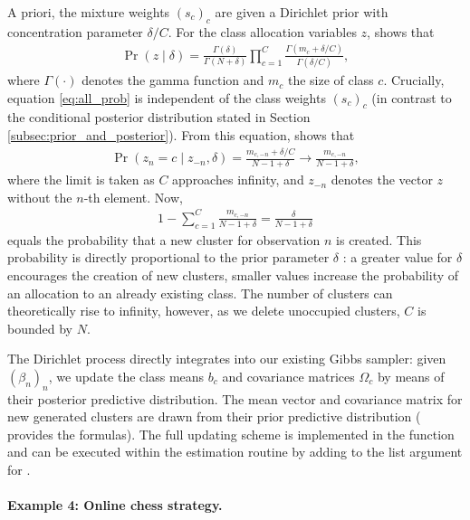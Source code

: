 \documentclass[article,shortnames]{jss}
\newcommand{\fct}[1]{\code{#1()}}
\begin{document}
A priori, the mixture weights $(s_c)_c$ are given a Dirichlet prior with concentration parameter $\delta/C$. For the class allocation variables $z$, \cite{Rasmussen:2000} shows that
\begin{align}
  \label{eq:all_prob}
  \Pr(z \mid \delta) = \frac{\Gamma(\delta)}{\Gamma(N+\delta)} \prod_{c=1}^C \frac{\Gamma(m_c + \delta/C)}{\Gamma(\delta/C)},
\end{align}
where $\Gamma(\cdot)$ denotes the gamma function and $m_c$ the size of class $c$. Crucially, equation \eqref{eq:all_prob} is independent of the class weights $(s_c)_c$ (in contrast to the conditional posterior distribution stated in Section \ref{subsec:prior_and_posterior}). From this equation, \cite{Li:2019} shows that
\begin{align*}
  \Pr(z_n = c \mid z_{-n}, \delta) = \frac{m_{c,-n} + \delta/C}{N-1+\delta} \to \frac{m_{c,-n}}{N-1+\delta},
\end{align*}
where the limit is taken as $C$ approaches infinity, and $z_{-n}$ denotes the vector $z$ without the $n$-th element. Now,
\begin{align*}
  1 - \sum_{c = 1}^C \frac{m_{c,-n}}{N-1+\delta} = \frac{\delta}{N-1+\delta}
\end{align*}
equals the probability that a new cluster for observation $n$ is created. This probability is directly proportional to the prior parameter $\delta$ \citep{Neal:2000}: a greater value for $\delta$ encourages the creation of new clusters, smaller values increase the probability of an allocation to an already existing class. The number of clusters can theoretically rise to infinity, however, as we delete unoccupied clusters, $C$ is bounded by $N$.

The Dirichlet process directly integrates into our existing Gibbs sampler: given $(\beta_n)_n$, we update the class means $b_c$ and covariance matrices $\Omega_c$ by means of their posterior predictive distribution. The mean vector and covariance matrix for new generated clusters are drawn from their prior predictive distribution (\cite{Li:2019} provides the formulas). The full updating scheme is implemented in the function \fct{update\_classes\_dp} and can be executed within the estimation routine \fct{fit\_model} by adding  to the list argument for .

\paragraph{Example 4: Online chess strategy.}
\end{document}
